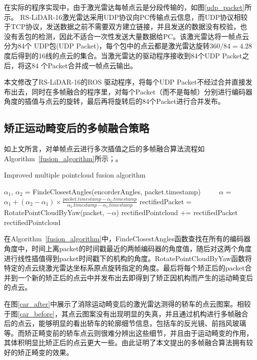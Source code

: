在实际的程序实现中，由于激光雷达每帧点云是分段传输的，如图\ref{udp_packet}所示。
RS-LiDAR-16激光雷达采用UDP协议向PC传输点云信息，而UDP协议相较于TCP协议，发送数据之前不需要双方建立链接，并且发送的数据没有校验，也没有丢包的检测，因此不适合一次性发送大量数据给PC。该激光雷达将一帧点云分为84个 UDP包(UDP Packet)，每个包中的点云都是激光雷达旋转$360 / 84 = 4.28$度后得到的16线的点云的集合。当激光雷达的驱动程序接收到84个UDP Packet之后，将这84 个Packet合并成一帧点云输出。

本文修改了RS-LiDAR-16的ROS 驱动程序，将每个UDP Packet不经过合并直接发布出去，同时在多帧融合的程序里，对每个Packet（而不是每帧）分别进行编码器角度的插值与点云的旋转，最后再将旋转后的84个Packet进行合并发布。

\subsection{矫正运动畸变后的多帧融合策略}

如上文所言，对单帧点云进行多次插值之后的多帧融合算法流程如Algorithm~\ref{fusion_algorithm}所示；。

\begin{algorithm}[t]
    \caption{Improved multiple pointcloud fusion algorithm} %
    \label{fusion_algorithm}
    \begin{algorithmic}[1]
        \State $\alpha_1$, $\alpha_2$ = FindeClosestAngles(encorderAngles, packet.timestamp)
    　　 \State $\alpha$ = $\alpha_1+(\alpha_2-\alpha_1)\times \frac{packet.timestamp - \alpha_1.timestamp}{\alpha_2.timestamp - \alpha_1.timestamp}$
        \State rectifiedPacket = RotatePointCloudByYaw(packet, $-\alpha$)
        \State rectifiedPointcloud += rectifiedPacket
    \EndFor
    \State \Return rectifiedPointcloud
    \end{algorithmic}
\end{algorithm}

在Algorithm~\ref{fusion_algorithm}中，FindeClosestAngles函数查找在所有的编码器角度中，时间上离packet的时间戳最近的两帧编码器的角度值，随后对这两个角度进行线性插值得到packet时间戳下的机构的角度。RotatePointCloudByYaw函数将特定的点云绕激光雷达坐标系原点旋转指定的角度。最后将每个矫正后的packet合并到一个新的矫正后的点云中并发布出去即得到了矫正因机构而产生的运动畸变后的点云。

在图\ref{car_after}中展示了消除运动畸变后的激光雷达测得的轿车的点云图案。相较于图\ref{car_before}，其点云图案没有出现明显的失真，并且通过机构进行多帧融合后的点云，能够明显的看出轿车的轮廓细节信息，包括车的反光镜、前挡风玻璃等。而矫正畸变前的轿车点云则很难分辨出这些细节，并且由于运动畸变的作用，其体积明显比矫正后的点云更大一些。由此证明了本文提出的多帧融合算法拥有较好的矫正畸变的效果。

